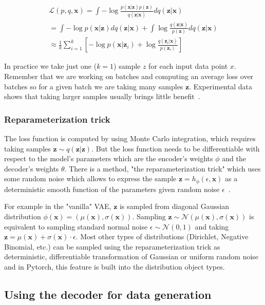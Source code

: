 \documentclass[11pt, a4paper]{report}
\theoremstyle{plain}
\theoremstyle{definition}
\theoremstyle{remark}
\newcommand{\x}{\mathbf{x}}
\newcommand{\z}{\mathbf{z}}
\newcommand{\LL}{\mathcal{L}}
\newcommand{\NN}{\mathcal{N}}
\begin{document}
\begin{equation}
\begin{aligned}
\LL(p,q,\x) = 
\int - \log \frac{p(\x|\z)p(\z)}{q(\z|\x)}dq(\z|\x) \\
= \int -\log p(\x|\z)dq(\z|\x) + 
\int \log \frac{q(\z|\x)}{p(\z)}dq(\z|\x) \\
\approx \frac{1}{k} \sum_{i=1}^k [-\log p(\x|\z_i)
+ \log \frac{q(\z_i|\x)}{p(\z_i)} ]
\label{eq:elbomc}
\end{aligned}
\end{equation}

In practice we take just one ($k=1$) sample $z$ for each input data point $x$.
Remember that we are working on batches and computing an average loss over
batches so for a given batch we are taking many samples $\z$.
Experimental data shows that taking larger samples usually brings little
benefit~\cite{kingma2019introduction}.

\subsubsection{Reparameterization trick}

The loss function is computed by using Monte Carlo integration, which requires
taking samples $\z \sim q(\z | \z)$. But the loss function needs to be 
differentiable with respect to the model's parameters which are 
the encoder's weights $\phi$ and the
decoder's weights $\theta$. There is a method, "the reparameterization
trick" which uses
some random noise  which allows to express the
sample $\z = h_{\phi}(\epsilon, \x)$ as a deterministic smooth function of 
the parameters 
given random noise $\epsilon$~\cite{kingma2013auto}.

For example in the "vanilla" VAE, $\z$ is sampled from
diagonal Gaussian distribution $\phi(\x) = (\mu(\x), \sigma(\x))$. Sampling
$\z \sim \NN(\mu(\x), \sigma(\x))$ is equivalent to sampling standard
normal noise
$\epsilon \sim \NN(0,1)$ and taking $\z = \mu(\x) + \sigma(\x) \cdot \epsilon$.
Most other types of distributions (Dirichlet, Negative Binomial, etc.) can be
sampled using the reparameterization trick as deterministic, differentiable
transformation of Gaussian or uniform random noise and in Pytorch, this feature
is built into the distribution object types.


\subsection{Using the decoder for data generation}
\end{document}
